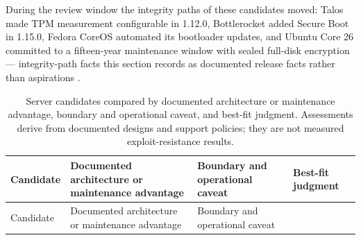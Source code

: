 \documentclass[
  english,
  9pt,
]{extarticle}
\begin{document}
During the review window the integrity paths of these candidates moved:
Talos made TPM measurement configurable in 1.12.0, Bottlerocket added
Secure Boot in 1.15.0, Fedora CoreOS automated its bootloader updates,
and Ubuntu Core 26 committed to a fifteen-year maintenance window with
sealed full-disk encryption --- integrity-path facts this section
records as documented release facts rather than aspirations
\citep{talos_1_12_notes, talos_secureboot_docs, bottlerocket_security_features, fedora_coreos_updates, ubuntu_core_26_fde}.

\begin{longtable}[]{@{}
  >{\raggedright\arraybackslash}p{}
  >{\raggedright\arraybackslash}p{}
  >{\raggedright\arraybackslash}p{}
  >{\raggedright\arraybackslash}p{}@{}}
\caption{Server candidates compared by documented architecture or
maintenance advantage, boundary and operational caveat, and best-fit
judgment. Assessments derive from documented designs and support
policies; they are not measured exploit-resistance
results.}\label{tbl:servers}\tabularnewline
\toprule\noalign{}
\begin{minipage}[b]{\linewidth}\raggedright
Candidate
\end{minipage} & \begin{minipage}[b]{\linewidth}\raggedright
Documented architecture or maintenance advantage
\end{minipage} & \begin{minipage}[b]{\linewidth}\raggedright
Boundary and operational caveat
\end{minipage} & \begin{minipage}[b]{\linewidth}\raggedright
Best-fit judgment
\end{minipage} \\
\midrule\noalign{}
\endfirsthead
\toprule\noalign{}
\begin{minipage}[b]{\linewidth}\raggedright
Candidate
\end{minipage} & \begin{minipage}[b]{\linewidth}\raggedright
Documented architecture or maintenance advantage
\end{minipage} & \begin{minipage}[b]{\linewidth}\raggedright
Boundary and operational caveat
\end{minipage} & \begin{minipage}[b]{\linewidth}\raggedright

\end{minipage}
\end{longtable}
\end{document}
